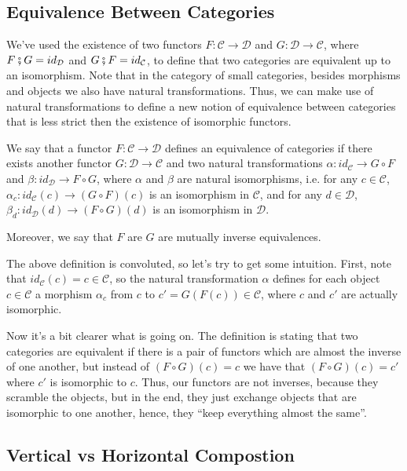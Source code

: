 \subsection{Equivalence Between Categories}

We've used the existence of two functors $F:\mathcal C \to \mathcal D$ and $G:\mathcal D \to \mathcal C$,
where $F \fatsemi G = id_\mathcal D$ and $G \fatsemi F = id_\mathcal C$,
to define that two categories are equivalent up to an isomorphism.
Note that in the category of small categories, besides morphisms and objects we also
have natural transformations. Thus, we can make use of natural transformations to
define a new notion of equivalence between categories that is less strict then 
the existence of isomorphic functors.

\begin{definition}
  We say that a functor $F:\mathcal C \to \mathcal D$ defines an equivalence of
  categories if there exists another functor $G:\mathcal D \to \mathcal C$ and
  two natural transformations
  $\alpha: id_\mathcal C \to G \circ F$ and
  $\beta: id_\mathcal D \to F \circ G$, where $\alpha$ and $\beta$ are natural isomorphisms,
  i.e. for any $c \in \mathcal C$,
  $\alpha_c:id_\mathcal C(c) \to (G \circ F)(c)$ is an
  isomorphism in $\mathcal C$, and for any $d \in \mathcal D$, 
  $\beta_d:id_\mathcal D(d) \to (F \circ G)(d)$ is an isomorphism in $\mathcal D$.

  Moreover, we say that $F$ are $G$ are mutually inverse equivalences.
  \label{def:EquivalenceCategories}
\end{definition}

The above definition is convoluted, so let's try to get some intuition.
First, note that $id_\mathcal C(c) = c \in \mathcal C$, so the natural transformation
$\alpha$ defines for each object $c \in \mathcal C$ a morphism $\alpha_c$ from $c$
to $c' = G(F(c)) \in \mathcal C$, where $c$ and $c'$ are actually isomorphic.

Now it's a bit clearer what is going on. The definition is stating that two
categories are equivalent if there is a pair of functors which are almost the inverse
of one another, but instead of $(F \circ G)(c) = c$ we have that
$(F \circ G )(c) = c'$  where $c'$ is isomorphic to $c$.
Thus, our functors are not inverses, because they scramble the objects, but in the end,
they just exchange objects that are isomorphic to one another, hence, they ``keep everything
almost the same''.

\subsection{Vertical vs Horizontal Compostion}

